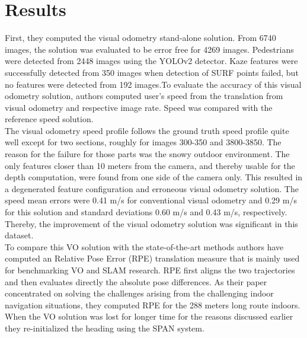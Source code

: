 \section{Results}    
First, they computed the visual odometry stand-alone solution. From 6740 images, the solution was
evaluated to be error free for 4269 images. Pedestrians were
detected from 2448 images using the YOLOv2 detector. Kaze
features were successfully detected from 350 images when
detection of SURF points failed, but no features were detected
from 192 images.To evaluate the accuracy of this visual odometry solution,
authors computed user’s speed from the translation from visual
odometry and respective image rate. Speed was compared
with the reference speed solution. \\
The visual odometry speed profile follows the ground truth
speed profile quite well except for two sections, roughly for
images 300-350 and 3800-3850. The reason for the failure
for those parts was the snowy outdoor environment. The
only features closer than 10 meters from the camera, and
thereby usable for the depth computation, were found from
one side of the camera only. This resulted in a degenerated feature configuration and erroneous visual odometry
solution. The speed mean errors were 0.41 m/s for
conventional visual odometry and 0.29 m/s for this solution
and standard deviations 0.60 m/s and 0.43 m/s, respectively.
Thereby, the improvement of the visual odometry solution was
significant in this dataset.\\
To compare this VO solution with the state-of-the-art methods authors have computed an Relative Pose Error (RPE) translation measure that is mainly used for benchmarking VO and
SLAM research. RPE first aligns the two trajectories and then
evaluates directly the absolute pose differences. As their
paper concentrated on solving the challenges arising from the
challenging indoor navigation situations, they computed RPE
for the 288 meters long route indoors. When the VO solution
was lost for longer time for the reasons discussed earlier
they re-initialized the heading using the SPAN system.\\
